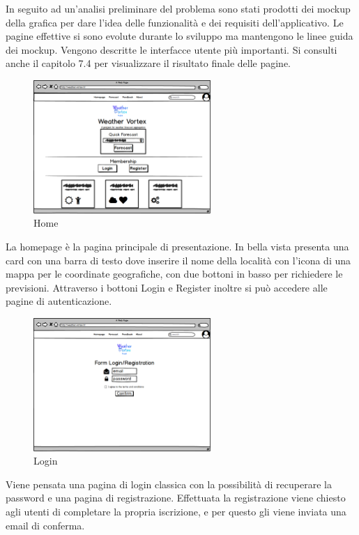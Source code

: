 In seguito ad un'analisi preliminare del problema sono stati prodotti dei mockup
della grafica per dare l'idea delle funzionalità e dei requisiti dell'applicativo. Le
pagine effettive si sono evolute durante lo sviluppo ma mantengono le linee guida
dei mockup. 
Vengono descritte le interfacce utente più importanti.
Si consulti anche il capitolo 7.4 per visualizzare il risultato finale delle pagine.
\begin{figure}[H]
    \caption{Home}
    \label{fig:Home}
    \centering
    \includegraphics[width=0.6\textwidth]{MockUps/homepage.png}
\end{figure}
La homepage è la pagina principale di presentazione.
In bella vista presenta una card con una barra di testo dove inserire il nome della località con l'icona di una mappa per le coordinate geografiche, con due bottoni in basso per richiedere le previsioni. 
Attraverso i bottoni Login e Register inoltre si può accedere alle pagine di autenticazione.
\begin{figure}[H]
    \caption{Login}
    \label{fig:Home}
    \centering
    \includegraphics[width=0.6\textwidth]{MockUps/Login_Register.png}
\end{figure}

Viene pensata una pagina di login classica con la possibilità di recuperare la password e una pagina di registrazione. Effettuata la registrazione viene chiesto agli utenti di completare la propria iscrizione, e per questo gli viene inviata una email di conferma.

